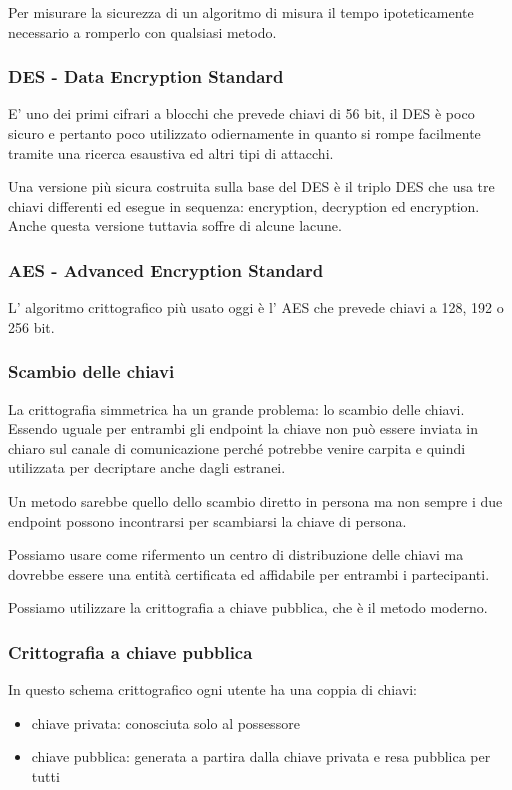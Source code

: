 Per misurare la sicurezza di un algoritmo di misura il tempo ipoteticamente necessario a romperlo con qualsiasi metodo.

\subsubsection{DES - Data Encryption Standard}
E' uno dei primi cifrari a blocchi che prevede chiavi di 56 bit, il DES è poco sicuro e pertanto poco utilizzato odiernamente in quanto si rompe facilmente tramite una ricerca esaustiva ed altri tipi di attacchi.

Una versione più sicura costruita sulla base del DES è il triplo DES che usa tre chiavi differenti ed esegue in sequenza: encryption, decryption ed encryption.
Anche questa versione tuttavia soffre di alcune lacune.

\subsubsection{AES - Advanced Encryption Standard}
L' algoritmo crittografico più usato oggi è l' AES che prevede chiavi a 128, 192 o 256 bit.

\subsubsection{Scambio delle chiavi}
La crittografia simmetrica ha un grande problema: lo scambio delle chiavi.
Essendo uguale per entrambi gli endpoint la chiave non può essere inviata in chiaro sul canale di comunicazione perché potrebbe venire carpita e quindi utilizzata per decriptare anche dagli estranei.

Un metodo sarebbe quello dello scambio diretto in persona ma non sempre i due endpoint possono incontrarsi per scambiarsi la chiave di persona.

Possiamo usare come rifermento un centro di distribuzione delle chiavi ma dovrebbe essere una entità certificata ed affidabile per entrambi i partecipanti.

Possiamo utilizzare la crittografia a chiave pubblica, che è il metodo moderno.

\subsubsection{Crittografia a chiave pubblica}
In questo schema crittografico ogni utente ha una coppia di chiavi:
\begin{itemize}
    \item chiave privata: conosciuta solo al possessore
    \item chiave pubblica: generata a partira dalla chiave privata e resa pubblica per tutti
\end{itemize}

